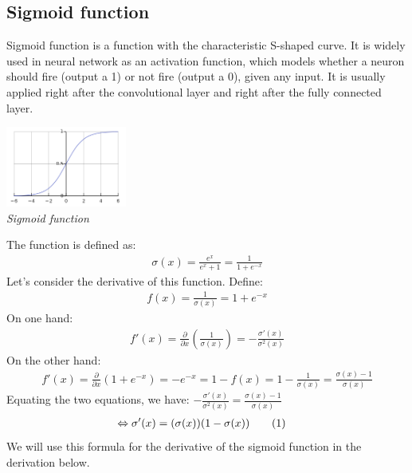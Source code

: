 \documentclass[12pt]{article}
\newcommand\numberthis{\stepcounter{equation}\tag{\theequation}}
\begin{document}
\subsection{Sigmoid function}
Sigmoid function is a function with the characteristic S-shaped curve. It is widely used in neural network as an activation function, which models whether a neuron should fire (output a 1) or not fire (output a 0), given any input. It is usually applied right after the convolutional layer and right after the fully connected layer.
\begin{center}
    \includegraphics[width=150px]{sigmoid.png}\\
    \textit{Sigmoid function}
\end{center}
The function is defined as:
\begin{align*}
    \sigma(x) = \frac{e^x}{e^x + 1} = \frac{1}{1 + e^{-x}}
\end{align*}
Let's consider the derivative of this function. Define:
\begin{align*}
    f(x) = \frac{1}{\sigma{(x)}} = 1 + e^{-x}
\end{align*}
On one hand:
\begin{align*}
    f'(x) = \frac{\partial}{\partial x}\left( \frac{1}{\sigma{(x)}}\right) = -\frac{\sigma'{(x)}}{\sigma^2{(x)}}
\end{align*}
On the other hand:
\begin{align*}
    f'(x) = \frac{\partial}{\partial x}\left( 1 + e^{-x}\right) = -e^{-x} = 1 - f(x) = 1 - \frac{1}{\sigma{(x)}} = \frac{\sigma{(x)} - 1}{\sigma{(x)}}
\end{align*}
Equating the two equations, we have:
$
-\frac{\sigma'{(x)}}{\sigma^2{(x)}} = \frac{\sigma{(x)} - 1}{\sigma{(x)}}
$
\begin{align*}
\Leftrightarrow \sigma'{(x)} &= (\sigma{(x)})(1 - \sigma{(x)})
\numberthis \label{sigmoid_derivative}
\end{align*}
We will use this formula for the derivative of the sigmoid function in the derivation below.
\end{document}
